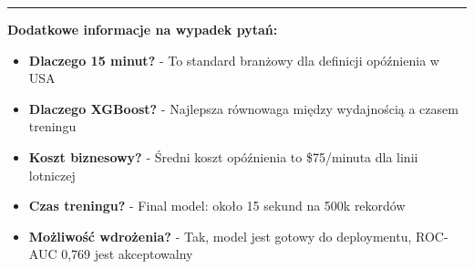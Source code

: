 \documentclass[12pt,a4paper]{article}
\begin{document}
\vspace{2cm}
\begin{center}
\rule{0.8\textwidth}{0.5pt}
\end{center}

\textbf{Dodatkowe informacje na wypadek pytań:}

\begin{itemize}
\item \textbf{Dlaczego 15 minut?} - To standard branżowy dla definicji opóźnienia w USA
\item \textbf{Dlaczego XGBoost?} - Najlepsza równowaga między wydajnością a czasem treningu
\item \textbf{Koszt biznesowy?} - Średni koszt opóźnienia to \$75/minuta dla linii lotniczej
\item \textbf{Czas treningu?} - Final model: około 15 sekund na 500k rekordów
\item \textbf{Możliwość wdrożenia?} - Tak, model jest gotowy do deploymentu, ROC-AUC 0,769 jest akceptowalny
\end{itemize}
\end{document}
